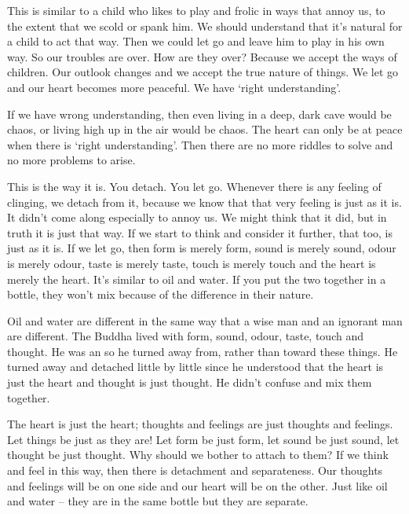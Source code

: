 This is similar to a child who likes to play and frolic in ways that annoy us, to the extent that we scold or spank him. We should understand that it's natural for a child to act that way. Then we could let go and leave him to play in his own way. So our troubles are over. How are they over? Because we accept the ways of children. Our outlook changes and we accept the true nature of things. We let go and our heart becomes more peaceful. We have `right understanding'. 

If we have wrong understanding, then even living in a deep, dark cave would be chaos, or living high up in the air would be chaos. The heart can only be at peace when there is `right understanding'. Then there are no more riddles to solve and no more problems to arise. 

This is the way it is. You detach. You let go. Whenever there is any feeling of clinging, we detach from it, because we know that that very feeling is just as it is. It didn't come along especially to annoy us. We might think that it did, but in truth it is just that way. If we start to think and consider it further, that too, is just as it is. If we let go, then form is merely form, sound is merely sound, odour is merely odour, taste is merely taste, touch is merely touch and the heart is merely the heart. It's similar to oil and water. If you put the two together in a bottle, they won't mix because of the difference in their nature. 

Oil and water are different in the same way that a wise man and an ignorant man are different. The Buddha lived with form, sound, odour, taste, touch and thought. He was an  so he turned away from, rather than toward these things. He turned away and detached little by little since he understood that the heart is just the heart and thought is just thought. He didn't confuse and mix them together. 

The heart is just the heart; thoughts and feelings are just thoughts and feelings. Let things be just as they are! Let form be just form, let sound be just sound, let thought be just thought. Why should we bother to attach to them? If we think and feel in this way, then there is detachment and separateness. Our thoughts and feelings will be on one side and our heart will be on the other. Just like oil and water -- they are in the same bottle but they are separate. 

